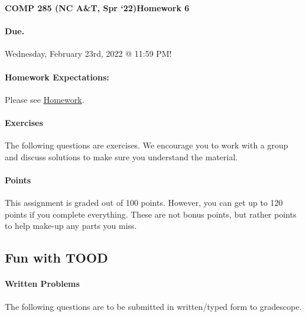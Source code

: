 \documentclass [12pt]{article}
\begin{document}
 

{\LARGE \textbf {COMP 285 (NC A\&T, Spr `22)}\hfill \textbf {Homework 6} } 
\vspace {1em} 
\begin{Instruction} 

\paragraph {Due.} Wednesday, February 23rd, 2022 @ 11:59 PM!
\end{Instruction} 

\vspace {1em} 
\begin{Instruction} \paragraph {Homework Expectations:} Please see \href{https://www.comp285.ml/homework/#general-homework-information}{Homework}.
\end{Instruction}

\vspace {1em} 
\begin{Instruction} 

\paragraph {Exercises} The following questions are exercises. We encourage you to work with a group and discuss solutions to make sure you understand the material.

\paragraph {Points} This assignment is graded out of 100 points. However, you can get up to 120 points if you complete everything. These are not bonus points, but rather points to help make-up any parts you miss.

\end{Instruction} 

\begin{centering}
\section*{Fun with TOOD}
\end{centering}

\begin{Instruction}

\paragraph{Written Problems} The following questions are to be submitted in written/typed form to gradescope.

\end{Instruction}
\end{document}
